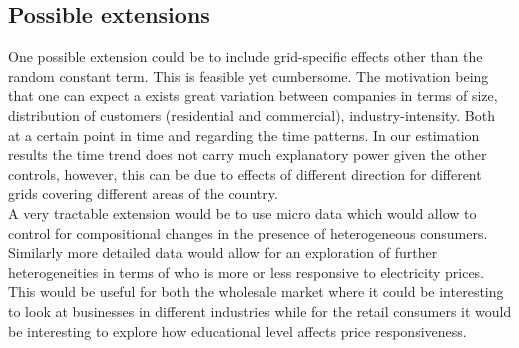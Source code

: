 \subsection{Possible extensions}
\label{subsec:r_extensions}
One possible extension could be to include grid-specific effects other than the random constant term. This is feasible yet cumbersome. The motivation being that one can expect a exists great variation between companies in terms of size, distribution of customers (residential and commercial), industry-intensity. Both at a certain point in time and regarding the time patterns. In our estimation results the time trend does not carry much explanatory power given the other controls, however, this can be due to effects of different direction for different grids covering different areas of the country.
\medskip\\
A very tractable extension would be to use micro data which would allow to control for compositional changes in the presence of heterogeneous consumers. Similarly more detailed data would allow for an exploration of further heterogeneities in terms of who is more or less responsive to electricity prices. This would be useful for both the wholesale market where it could be interesting to look at businesses in different industries while for the retail consumers it would be interesting to explore how educational level affects price responsiveness.
